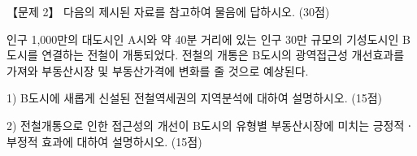 \begin{longquestion}{【문제 2】}
다음의 제시된 자료를 참고하여 물음에 답하시오. (30점) \par
\begin{framedtext}
인구 1,000만의 대도시인 A시와 약 40분 거리에 있는 인구 30만 규모의 기성도시인 B도시를 연결하는 전철이 개통되었다. 전철의 개통은 B도시의 광역접근성 개선효과를 가져와 부동산시장 및 부동산가격에 변화를 줄 것으로 예상된다.
\end{framedtext}
1) B도시에 새롭게 신설된 전철역세권의 지역분석에 대하여 설명하시오. (15점) \par
2) 전철개통으로 인한 접근성의 개선이 B도시의 유형별 부동산시장에 미치는 긍정적ㆍ부정적 효과에 대하여 설명하시오. (15점) \par
\end{longquestion}
